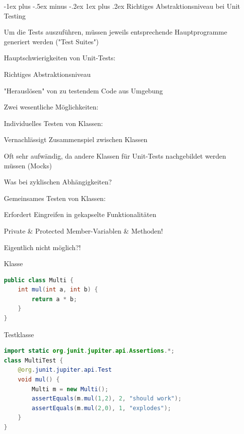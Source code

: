 \documentclass[10pt]{article}
\makeatletter
\renewcommand{\subsubsection}{\@startsection{subsubsection}{3}{0mm}%
                                {-1ex plus -.5ex minus -.2ex}%
                                {1ex plus .2ex}%
                                {\normalfont\small\bfseries}}
\makeatother
\begin{document}
\subsubsection{Richtiges Abstraktionsniveau bei Unit Testing}
\begin{itemize*}
  \item Um die Tests auszuführen, müssen jeweils entsprechende Hauptprogramme generiert werden ("Test Suites")
  \item Hauptschwierigkeiten von Unit-Tests:
  \begin{itemize*}
    \item Richtiges Abstraktionsniveau
    \item "Herauslösen" von zu testendem Code aus Umgebung
  \end{itemize*}
  \item Zwei wesentliche Möglichkeiten:
  \begin{itemize*}
    \item Individuelles Testen von Klassen:
    \begin{itemize*}
      \item Vernachlässigt Zusammenspiel zwischen Klassen
      \item Oft sehr aufwändig, da andere Klassen für Unit-Tests nachgebildet werden müssen (Mocks)
      \item Was bei zyklischen Abhängigkeiten?
    \end{itemize*}
    \item Gemeinsames Testen von Klassen:
    \begin{itemize*}
      \item Erfordert Eingreifen in gekapselte Funktionalitäten
      \item Private \& Protected Member-Variablen \& Methoden!
      \item Eigentlich nicht möglich?!
    \end{itemize*}
  \end{itemize*}
\end{itemize*}

Klasse
\begin{lstlisting}[language=java]
public class Multi {
    int mul(int a, int b) {
        return a * b;
    }
}
\end{lstlisting}

Testklasse
\begin{lstlisting}[language=java]
import static org.junit.jupiter.api.Assertions.*;
class MultiTest {
    @org.junit.jupiter.api.Test
    void mul() {
        Multi m = new Multi();
        assertEquals(m.mul(1,2), 2, "should work");
        assertEquals(m.mul(2,0), 1, "explodes");
    }
}
\end{lstlisting}
\end{document}
